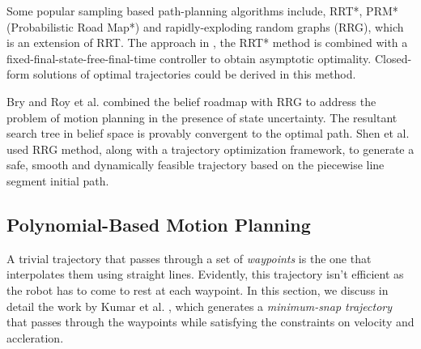 Some popular sampling based path-planning algorithms include, RRT*, PRM* (Probabilistic Road Map*) and rapidly-exploding random graphs (RRG), which is an extension of RRT. The approach in \cite{webb2013kinodynamic}, the RRT* method is combined with a fixed-final-state-free-final-time controller to obtain asymptotic optimality. Closed-form solutions of optimal trajectories could be derived in this method. 

Bry and Roy et al. \cite{bry2011rapidly} combined the belief roadmap with RRG to address the problem of motion planning in the presence of state uncertainty. The resultant search tree in belief space is provably convergent to the optimal path. Shen et al. \cite{shen2017gradient} used RRG method, along with a trajectory optimization framework, to generate a safe, smooth and dynamically feasible trajectory based on the piecewise line segment initial path. 

\subsection{Polynomial-Based Motion Planning}
\label{sec:poly_based_planning}
A trivial trajectory that passes through a set of \textit{waypoints} is the one that interpolates them using straight lines. Evidently, this trajectory isn't efficient as the robot has to come to rest at each waypoint. In this section, we discuss in detail the work by Kumar et al. \cite{mellinger2011minimum}, which generates a \textit{minimum-snap trajectory} that passes through the waypoints while satisfying the constraints on velocity and accleration. 

